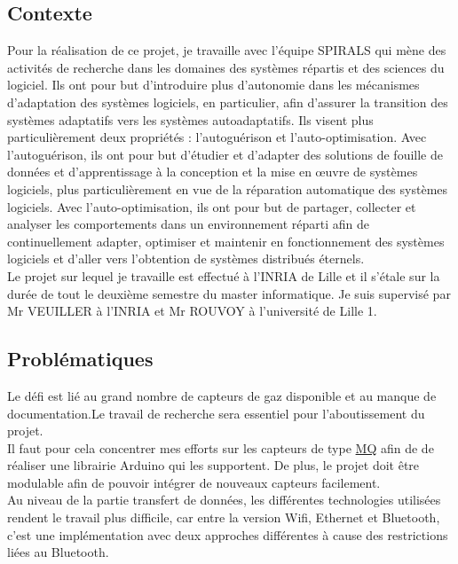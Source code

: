 \subsection{Contexte}
Pour la réalisation de ce projet, je travaille avec l'équipe SPIRALS qui mène des activités de recherche dans les domaines des systèmes répartis et des sciences du logiciel. Ils ont pour but d'introduire plus d'autonomie dans les mécanismes d'adaptation des systèmes logiciels, en particulier, afin d'assurer la transition des systèmes adaptatifs vers les systèmes autoadaptatifs. Ils visent plus particulièrement deux propriétés : l'autoguérison et l'auto-optimisation. Avec l'autoguérison, ils ont pour but d'étudier et d'adapter des solutions de fouille de données et d'apprentissage à la conception et la mise en œuvre de systèmes logiciels, plus particulièrement en vue de la réparation automatique des systèmes logiciels. Avec l'auto-optimisation, ils ont pour but de partager, collecter et analyser les comportements dans un environnement réparti afin de continuellement adapter, optimiser et maintenir en fonctionnement des systèmes logiciels et d'aller vers l'obtention de systèmes distribués éternels.\\ 

Le projet sur lequel je travaille est effectué à l'INRIA de Lille et il s'étale sur la durée de tout le deuxième semestre du master informatique. Je suis supervisé par Mr VEUILLER à l'INRIA et Mr ROUVOY à l'université de Lille 1.\\

\subsection{Problématiques}
Le défi est lié au grand nombre de capteurs de gaz disponible et au manque de documentation.Le travail de recherche sera essentiel pour l'aboutissement du projet.\\

Il faut pour cela concentrer mes efforts sur les capteurs de type \href{http://www.china-total.com/Product/meter/gas-sensor/Gas-sensor.htm}{MQ} afin de de réaliser une librairie Arduino qui les supportent.
De plus, le projet doit être modulable afin de pouvoir intégrer de nouveaux capteurs facilement.\\

Au niveau de la partie transfert de données, les différentes technologies utilisées rendent le travail plus difficile, car entre la version Wifi, Ethernet et Bluetooth, c'est une implémentation avec deux approches différentes à cause des restrictions liées au Bluetooth.\\

